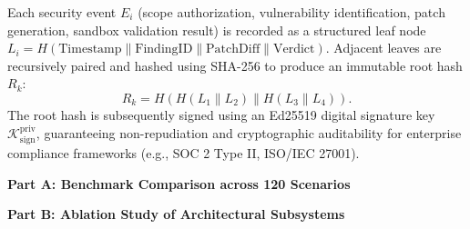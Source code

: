 \documentclass[journal,twoside]{IEEEtran}
\begin{document}
Each security event $E_i$ (scope authorization, vulnerability identification, patch generation, sandbox validation result) is recorded as a structured leaf node $L_i = H(\text{Timestamp} \parallel \text{FindingID} \parallel \text{PatchDiff} \parallel \text{Verdict})$. Adjacent leaves are recursively paired and hashed using SHA-256 to produce an immutable root hash $R_k$:
\begin{equation}
R_k = H\left(H(L_1 \parallel L_2) \parallel H(L_3 \parallel L_4)\right).
\end{equation}
The root hash is subsequently signed using an Ed25519 digital signature key $\mathcal{K}_{\text{sign}}^{\text{priv}}$, guaranteeing non-repudiation and cryptographic auditability for enterprise compliance frameworks (e.g., SOC 2 Type II, ISO/IEC 27001).

\begin{table}[!t]
\caption{Comprehensive Performance Comparison and Subsystem Ablation Analysis}
\label{tab:unified_performance}
\centering
\begin{minipage}{0.48\textwidth}
\centering
\textbf{Part A: Benchmark Comparison across 120 Scenarios} \\[4pt]
\end{minipage}
\hfill
\begin{minipage}{0.48\textwidth}
\centering
\textbf{Part B: Ablation Study of Architectural Subsystems} \\[4pt]
\end{minipage}
\end{table}
\end{document}
